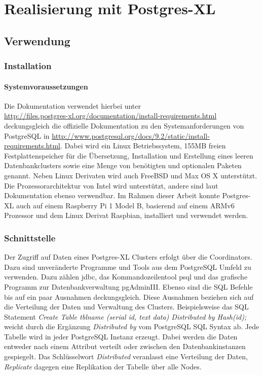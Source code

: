 \chapter{Realisierung mit Postgres-XL}
\label{chapter:postgresxl}

\section{Verwendung}

\subsection{Installation}
\subsubsection{Systemvoraussetzungen}
Die Dokumentation verwendet hierbei unter\\
\url{http://files.postgres-xl.org/documentation/install-requirements.html} deckungsgleich die offizielle Dokumentation zu den Systemanforderungen von PostgreSQL in \url{http://www.postgresql.org/docs/9.2/static/install-requirements.html}.
Dabei wird ein Linux Betriebssystem, 155MB freien Festplattenspeicher für die Übersetzung, Installation und Erstellung eines leeren Datenbankclusters sowie eine Menge von benötigten und optionalen Paketen genannt.
Neben Linux Derivaten wird auch FreeBSD und Max OS X unterstützt.
Die Prozessorarchitektur von Intel wird unterstützt, andere sind laut Dokumentation ebenso verwendbar.
Im Rahmen dieser Arbeit konnte Postgres-XL auch auf einem Raspberry Pi 1 Model B, basierend auf einem ARMv6 Prozessor und dem Linux Derivat Raspbian, installiert und verwendet werden.


\subsection{Schnittstelle}
Der Zugriff auf Daten eines Postgres-XL Clusters erfolgt über die Coordinators.
Dazu sind unveränderte Programme und Tools aus dem PostgreSQL Umfeld zu verwenden.
Dazu zählen \Gls{jdbc}, das Kommandozeilentool psql und das grafische Programm zur Datenbankverwaltung pgAdminIII.
Ebenso sind die SQL Befehle bis auf ein paar Ausnahmen deckungsgleich.
Diese Ausnahmen beziehen sich auf die Verteilung der Daten und Verwaltung des Clusters.
Beispielsweise das SQL Statement \textit{Create Table tblname (serial id, text data) Distributed by Hash(id);} weicht durch die Ergänzung \textit{Distributed by} vom PostgreSQL SQL Syntax ab.
Jede Tabelle wird in jeder PostgreSQL Instanz erzeugt.
Dabei werden die Daten entweder nach einem Attribut verteilt oder zwischen den Datenbankinstanzen gespiegelt.
Das Schlüsselwort \textit{Distributed} veranlasst eine Verteilung der Daten, \textit{Replicate} dagegen eine Replikation der Tabelle über alle Nodes.


